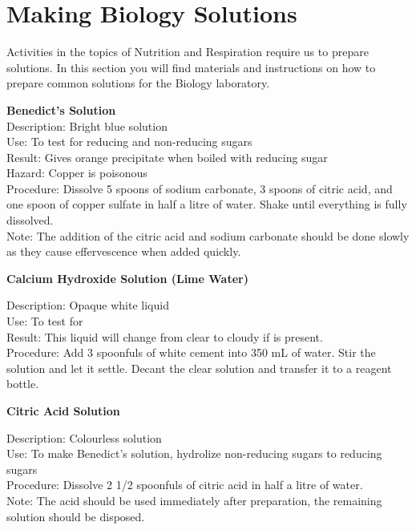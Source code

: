 \chapter{Making Biology Solutions}
Activities in the topics of Nutrition and Respiration require us to prepare solutions. In this section you will find materials and instructions on how to prepare common solutions for the Biology laboratory.

\begin{flushleft}
\textbf{Benedict's Solution}\\
Description: Bright blue solution\\
Use: To test for reducing and non-reducing sugars\\
Result: Gives orange precipitate when boiled with reducing sugar\\
Hazard: Copper is poisonous\\
Procedure: Dissolve 5 spoons of sodium carbonate, 3 spoons of citric acid,
and one spoon of copper sulfate in half a litre of water. Shake until everything
is fully dissolved.\\Note: The addition of the citric acid and sodium carbonate should be done slowly as they cause effervescence when added quickly.
\end{flushleft}

\begin{flushleft}
\textbf{Calcium Hydroxide Solution (Lime Water)}
\end{flushleft}
\vspace{-10pt}
Description: Opaque white liquid\\
Use: To test for \\
Result: This liquid will change from clear to cloudy if  is present.\\
Procedure: Add 3 spoonfuls of white cement into 350 mL of water. Stir the solution and let it settle. Decant the clear solution and transfer it to a reagent bottle.\\

\begin{flushleft}
\textbf{Citric Acid Solution}
\end{flushleft}
\vspace{-10pt}
Description: Colourless solution\\
Use: To make Benedict's solution, hydrolize non-reducing sugars to reducing sugars\\
Procedure: Dissolve 2 1/2 spoonfuls of citric acid in half a litre of water.\\
Note: The acid should be used immediately after preparation, the remaining solution should be disposed.

